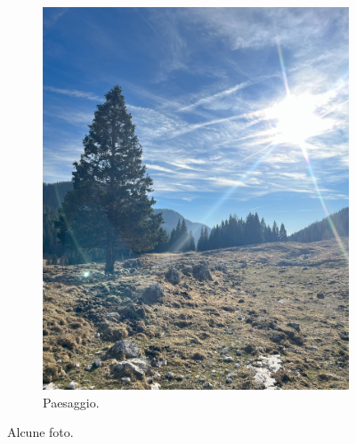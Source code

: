 \documentclass{article}
\begin{document}
\begin{figure}[htbp!]
\begin{subfigure}[b]{0.45\textwidth}
        \includegraphics[width=\textwidth]{images/foto_paesaggio.jpg}
        \caption{Paesaggio.}
    \end{subfigure}

    \caption{Alcune foto.}
\end{figure}
\end{document}

